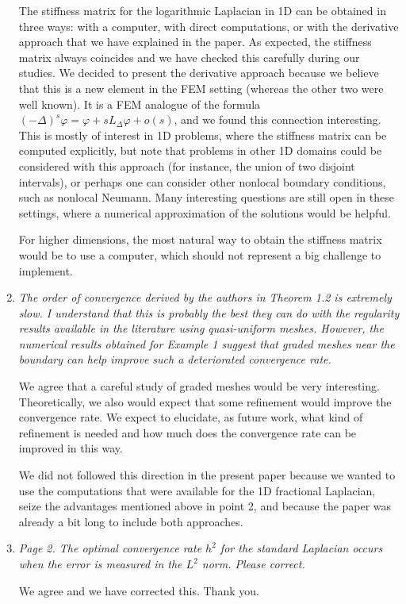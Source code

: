 \documentclass[11 pt]{article}
\numberwithin{equation}{section}
\begin{document}
\begin{enumerate}
The stiffness matrix for the logarithmic Laplacian in 1D can be obtained in three ways: with a computer, with direct computations, or with the derivative approach that we have explained in the paper. As expected, the stiffness matrix always coincides and we have checked this carefully during our studies. We decided to present the derivative approach because we believe that this is a new element in the FEM setting (whereas the other two were well known). It is a FEM analogue of the formula
$(-\Delta)^s\varphi = \varphi + sL_\Delta \varphi + o(s)$, and we found this connection interesting.  This is mostly of interest in 1D problems, where the stiffness matrix can be computed explicitly, but note that problems in other 1D domains could be considered with this approach (for instance, the union of two disjoint intervals), or perhaps one can consider other nonlocal boundary conditions, such as nonlocal Neumann.  Many interesting questions are still open in these settings, where a numerical approximation of the solutions would be helpful.

For higher dimensions, the most natural way to obtain the stiffness matrix would be to use a computer, which should not represent a big challenge to implement.

\item \emph{
 The order of convergence derived by the authors in Theorem 1.2 is extremely slow. I understand that this is probably the best they can do with the regularity results available in the literature using quasi-uniform meshes. However, the numerical results obtained for Example 1 suggest that graded meshes near the boundary can help improve such a deteriorated convergence rate.
}

We agree that a careful study of graded meshes would be very interesting. Theoretically, we also would expect that some refinement would improve the convergence rate.  We expect to elucidate, as future work, what kind of refinement is needed and how much does the convergence rate can be improved in this way.

We did not followed this direction in the present paper because we wanted to use the computations that were available for the 1D fractional Laplacian, seize the advantages mentioned above in point 2, and because the paper was already a bit long to include both approaches.

\item
\emph{Page 2. The optimal convergence rate $h^2$ for the standard Laplacian occurs when the error is measured in the $L^2$ norm. Please correct.
}

We agree and we have corrected this. Thank you.
\end{enumerate}
\end{document}
